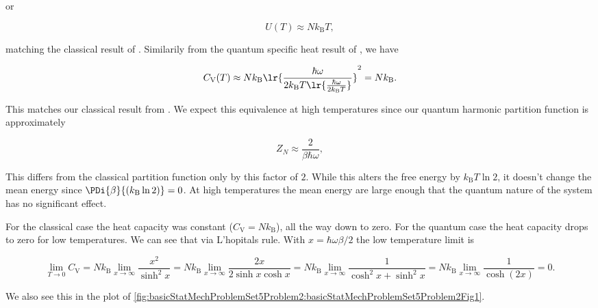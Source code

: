 {or

\begin{equation}\label{eqn:basicStatMechProblemSet5Problem2:400}
U(T) \approx N k_{\mathrm{B}} T,
\end{equation}

matching the classical result of .  Similarily from the quantum specific heat result of , we have

\begin{equation}\label{eqn:basicStatMechProblemSet5Problem2:420}
C_{\mathrm{V}}(T) \approx
N k_{\mathrm{B}}
\lr{\frac{\hbar \omega}{2 k_{\mathrm{B}} T
\lr{ \frac{\hbar \omega}{2 k_{\mathrm{B}} T}}
} }^2
= N k_{\mathrm{B}}.
\end{equation}

This matches our classical result from .  We expect this equivalence at high temperatures since our quantum harmonic partition function  is approximately

\begin{equation}\label{eqn:basicStatMechProblemSet5Problem2:440}
Z_N \approx \frac{2}{\beta \hbar \omega},
\end{equation}

This differs from the classical partition function only by this factor of $2$.  While this alters the free energy by $k_{\mathrm{B}} T \ln 2$, it doesn't change the mean energy since $\PDi{\beta}{(k_{\mathrm{B}} \ln 2)} = 0$.  At high temperatures the mean energy are large enough that the quantum nature of the system has no significant effect.


For the classical case the heat capacity was constant ($C_{\mathrm{V}} = N k_{\mathrm{B}}$), all the way down to zero.  For the quantum case the heat capacity drops to zero for low temperatures.  We can see that via L'hopitals rule.  With $x = \hbar \omega \beta/2$ the low temperature limit is

\begin{dmath}\label{eqn:basicStatMechProblemSet5Problem2:460}
\lim_{T \rightarrow 0} C_{\mathrm{V}} 
= N k_{\mathrm{B}} \lim_{x \rightarrow \infty} 
\frac{x^2}{\sinh^2 x}
= N k_{\mathrm{B}} \lim_{x \rightarrow \infty} 
\frac{2x }{2 \sinh x \cosh x}
= N k_{\mathrm{B}} \lim_{x \rightarrow \infty} 
\frac{1 }{\cosh^2 x + \sinh^2 x}
= N k_{\mathrm{B}} \lim_{x \rightarrow \infty} 
\frac{1 }{\cosh (2 x) }
= 0.
\end{dmath}

We also see this in the plot of \cref{fig:basicStatMechProblemSet5Problem2:basicStatMechProblemSet5Problem2Fig1}.

}
